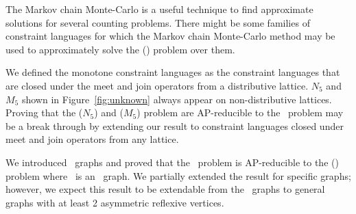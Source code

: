 The Markov chain Monte-Carlo is a useful technique to find approximate solutions for
several counting problems. There might be some families of constraint languages for 
which the Markov chain Monte-Carlo method may be used to approximately solve the 
\ccsp(\mrelset) problem over them.

We defined the monotone constraint languages as the constraint languages that
are closed under the meet and join operators from a distributive lattice.
\(N_5\) and \(M_5\) shown in Figure~\ref{fig:unknown} always appear on non-distributive 
lattices. Proving that the \chom(\(N_5\)) and \chom(\(M_5\)) problem are AP-reducible to
the \cbis\ problem may be a break through by extending  our result to
constraint languages closed under meet and join operators from any lattice.

We introduced \RBA\ graphs and proved that the \cbis\ problem is AP-reducible to
the \chom(\mH) problem where \mH\ is an \RBA\ graph. We partially extended the result
for specific graphs; however, we expect this result to be extendable from the \RBA\ graphs
to general graphs with at least 2 asymmetric reflexive vertices.